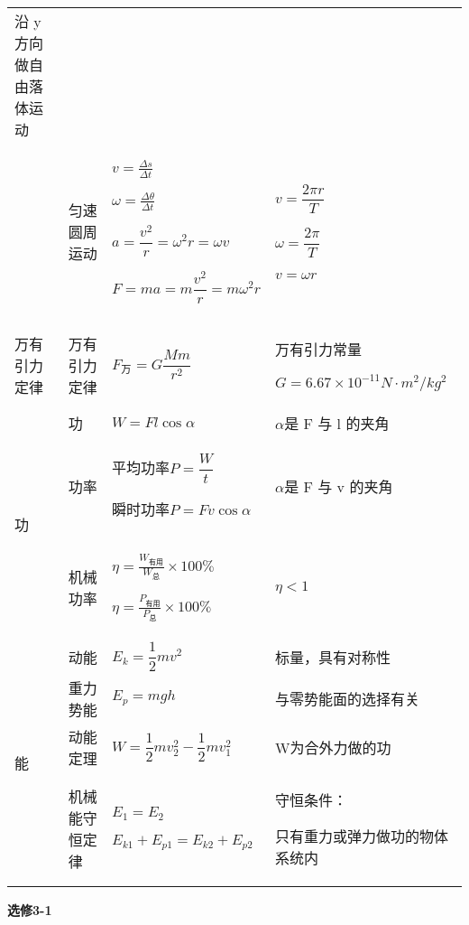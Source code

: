 \begin{longtable}[]{@{}|m{1.07cm}|m{2.43cm}|m{4cm}|m{5.5cm}|@{}}
	沿 y 方向做自由落体运动\tabularnewline
	\cline{2-4}
	&匀速圆周运动&
	$v=\frac{\Delta s}{\Delta t}$

	$\omega=\frac{\Delta \theta}{\Delta t}$

	$a=\dfrac{v^2}{r}=\omega^2r=\omega v$

	$F=ma=m\dfrac{v^2}{r}=m\omega^2r$
	&
	$v=\dfrac{2\pi r}{T}$

	$\omega=\dfrac{2\pi}{T}$

	$v=\omega r$\tabularnewline
	\cline{1-4}
	万有引力定律&万有引力定律&$F_\text{万}=G\dfrac{Mm}{r^2}$&万有引力常量

	$G= 6.67 \times 10^{−11}N·𝑚^2/kg^2$\tabularnewline
	\cline{1-4}
	\multirow{3}{1cm}{功}
	&功 &$W=Fl\cos\alpha$&$\alpha$是 F 与 l 的夹角\tabularnewline
	\cline{2-4}
	&功率&
	平均功率$P=\dfrac{W}{t}$

	瞬时功率$P=Fv\cos\alpha$
	&$\alpha$是 F 与 v 的夹角\tabularnewline
	\cline{2-4}
	&机械功率&$\eta =\frac{W_\text{有用}}{W_\text{总}}\times 100\% $
	
	$\eta =\frac{P_\text{有用}}{P_\text{总}}\times 100\%$
	&$\eta<1$\tabularnewline
	\cline{1-4}
	\multirow{4}{1cm}{能}
	&
	动能&$E_k=\dfrac{1}{2}mv^2$&标量，具有对称性\tabularnewline
	\cline{2-4}
	&重力势能&$E_p=mgh$&与零势能面的选择有关\tabularnewline
	\cline{2-4}
	&动能定理&$W=\dfrac{1}{2}mv_2^2-\dfrac{1}{2}mv_1^2$&W为合外力做的功\tabularnewline
	\cline{2-4}
	&机械能守恒定律&
	$E_1=E_2$

	$E_{k1}+E_{p1}=E_{k2}+E_{p2}$
	&守恒条件：

	只有重力或弹力做功的物体系统内\tabularnewline
	\cline{1-4}
\end{longtable}
\begin{center}
	\textbf{选修3-1}
\end{center}
